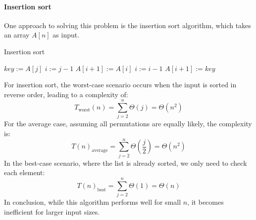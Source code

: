\paragraph*{Insertion sort}
One approach to solving this problem is the insertion sort algorithm, which takes an array $A[n]$ as input.
\begin{algorithm}[H]
    \caption{Insertion sort}
        \begin{algorithmic}[1]
                \State $key := A[j]$
                \State $i := j-1$
                    \State $A[i+1] := A[i]$
                    \State $i := i - 1$
                \EndWhile
                \State $A[i+1] := key$
            \EndFor
        \end{algorithmic}
\end{algorithm}
For insertion sort, the worst-case scenario occurs when the input is sorted in reverse order, leading to a complexity of:
\[T_{\text{worst}}(n)=\sum_{j=2}^n\Theta(j)=\Theta(n^2)\]
For the average case, assuming all permutations are equally likely, the complexity is:
\[T(n)_{\text{average}}=\sum_{j=2}^n\Theta\left(\dfrac{j}{2}\right)=\Theta(n^2)\]
In the best-case scenario, where the list is already sorted, we only need to check each element:
\[T(n)_{\text{best}}=\sum_{j=2}^n\Theta\left(1\right)=\Theta(n)\]
In conclusion, while this algorithm performs well for small $n$, it becomes inefficient for larger input sizes.